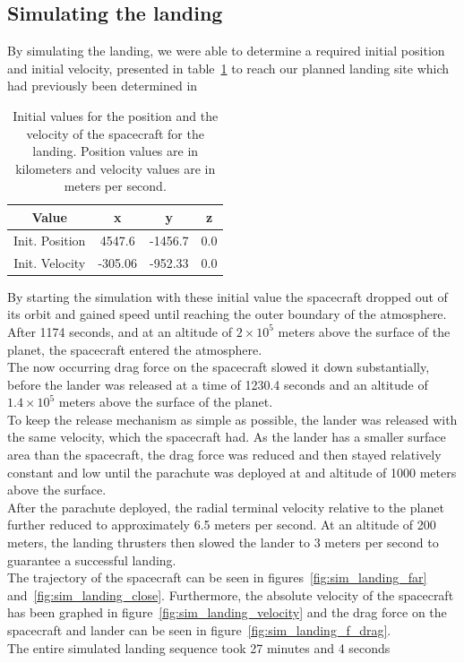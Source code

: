\documentclass[reprint,english,notitlepage]{revtex4-2}
\begin{document}
\subsection{Simulating the landing}\label{subsec:simulating-the-landing}
    By simulating the landing, we were able to determine a required initial position and initial velocity, presented in table~\ref{tab:initial_values} to reach our planned landing site which had previously been determined in%

    \begin{table}[h]
        \begin{tabular}{|c|c|c|c|}
            \hline
            Value & x & y & z \\
            \hline
            Init. Position & 4547.6 & -1456.7 & 0.0\\
            \hline
            Init. Velocity & -305.06 & -952.33 & 0.0\\
            \hline
        \end{tabular}
        \caption{Initial values for the position and the velocity of the spacecraft for the landing. Position values are in kilometers and velocity values are in meters per second.}
        \label{tab:initial_values}
    \end{table}

    By starting the simulation with these initial value the spacecraft dropped out of its orbit and gained speed until reaching the outer boundary of the atmosphere.
    After 1174 seconds, and at an altitude of $2 \times 10^5$ meters above the surface of the planet, the spacecraft entered the atmosphere.\\
    The now occurring drag force on the spacecraft slowed it down substantially, before the lander was released at a time of 1230.4 seconds and an altitude of $1.4 \times 10^5$ meters above the surface of the planet.\\
    To keep the release mechanism as simple as possible, the lander was released with the same velocity, which the spacecraft had.
    As the lander has a smaller surface area than the spacecraft, the drag force was reduced and then stayed relatively constant and low until the parachute was deployed at and altitude of 1000 meters above the surface.\\
    After the parachute deployed, the radial terminal velocity relative to the planet further reduced to approximately 6.5 meters per second.
    At an altitude of 200 meters, the landing thrusters then slowed the lander to 3 meters per second to guarantee a successful landing.\\
    The trajectory of the spacecraft can be seen in figures~\ref{fig:sim_landing_far} and~\ref{fig:sim_landing_close}.
    Furthermore, the absolute velocity of the spacecraft has been graphed in figure~\ref{fig:sim_landing_velocity} and the drag force on the spacecraft and lander can be seen in figure~\ref{fig:sim_landing_f_drag}.\\
    The entire simulated landing sequence took  27 minutes and 4 seconds
\end{document}
